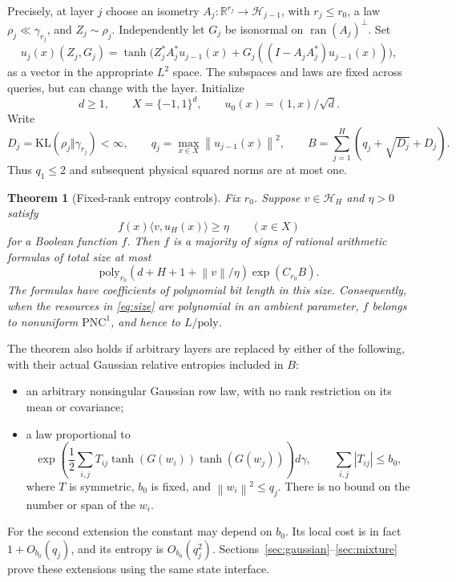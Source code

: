\documentclass[11pt]{article}
\newtheorem{theorem}{Theorem}
\newcommand{\R}{\mathbb R}
\newcommand{\norm}[1]{\left\lVert #1\right\rVert}
\newcommand{\KL}{\mathrm{KL}}
\newcommand{\poly}{\mathrm{poly}}
\newcommand{\PNC}{\mathrm{PNC}^{1}}
\begin{document}
Precisely, at layer $j$ choose an isometry $A_j:\R^{r_j}\to\mathcal H_{j-1}$, with $r_j\le r_0$, a law $\rho_j\ll\gamma_{r_j}$, and $Z_j\sim\rho_j$. Independently let $G_j$ be isonormal on $\operatorname{ran}(A_j)^\perp$. Set
\begin{equation}
 u_j(x)(Z_j,G_j)=\tanh\bigl(Z_j^*A_j^*u_{j-1}(x)+G_j((I-A_jA_j^*)u_{j-1}(x))\bigr),
 \label{eq:path}
\end{equation}
as a vector in the appropriate $L^2$ space. The subspaces and laws are fixed across queries, but can change with the layer. Initialize
\[
 d\ge1,\qquad X=\{-1,1\}^d,\qquad u_0(x)=(1,x)/\sqrt d.
\]
Write
\[
 D_j=\KL(\rho_j\Vert\gamma_{r_j})<\infty,
 \qquad q_j=\max_{x\in X}\norm{u_{j-1}(x)}^2,
 \qquad B=\sum_{j=1}^H(q_j+\sqrt{D_j}+D_j).
\]
Thus $q_1\le2$ and subsequent physical squared norms are at most one.

\begin{theorem}[Fixed-rank entropy controls]
\label{thm:main}
Fix $r_0$. Suppose $v\in\mathcal H_H$ and $\eta>0$ satisfy
\[
 f(x)\langle v,u_H(x)\rangle\ge\eta\qquad(x\in X)
\]
for a Boolean function $f$. Then $f$ is a majority of signs of rational arithmetic formulas of total size at most
\begin{equation}
 \poly_{r_0}(d+H+1+\norm v/\eta)\exp(C_{r_0}B).
 \label{eq:size}
\end{equation}
The formulas have coefficients of polynomial bit length in this size. Consequently, when the resources in \eqref{eq:size} are polynomial in an ambient parameter, $f$ belongs to nonuniform $\PNC$, and hence to $L/\mathrm{poly}$.
\end{theorem}


The theorem also holds if arbitrary layers are replaced by either of the following, with their actual Gaussian relative entropies included in $B$:
\begin{itemize}
\item an arbitrary nonsingular Gaussian row law, with no rank restriction on its mean or covariance;
\item a law proportional to
\[
 \exp\left(\frac12\sum_{i,j}T_{ij}\tanh(G(w_i))\tanh(G(w_j))\right)d\gamma,
 \qquad \sum_{i,j}|T_{ij}|\le b_0,
\]
where $T$ is symmetric, $b_0$ is fixed, and $\norm{w_i}^2\le q_j$. There is no bound on the number or span of the $w_i$.
\end{itemize}
For the second extension the constant may depend on $b_0$. Its local cost is in fact $1+O_{b_0}(q_j)$, and its entropy is $O_{b_0}(q_j^2)$. Sections~\ref{sec:gaussian}--\ref{sec:mixture} prove these extensions using the same state interface.
\end{document}
